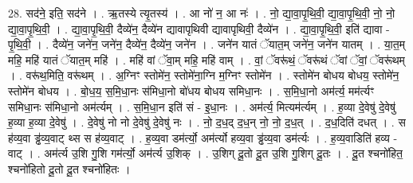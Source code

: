 \documentclass[17pt]{extarticle}
\begin{document}
28. सद॑ने॒ इति॒ सद॑ने । . ऋ॒तस्ये त्यृ॒तस्य॑ । . आ नो॑ न॒ आ नः॑ । . नो॒ द्या॒वा॒पृ॒थि॒वी॒ द्या॒वा॒पृ॒थि॒वी॒ नो॒ नो॒ द्या॒वा॒पृ॒थि॒वी॒ । . द्या॒वा॒पृ॒थि॒वी॒ दैव्ये॑न॒ दैव्ये॑न द्यावापृथिवी द्यावापृथिवी॒ दैव्ये॑न । . द्या॒वा॒पृ॒थि॒वी॒ इति॑ द्यावा - पृ॒थि॒वी॒ । . दैव्ये॑न॒ जने॑न॒ जने॑न॒ दैव्ये॑न॒ दैव्ये॑न॒ जने॑न । . जने॑न यातं ॅयात॒म् जने॑न॒ जने॑न यातम् । . या॒त॒म् महि॒ महि॑ यातं ॅयात॒म् महि॑ । . महि॑ वां ॅवा॒म् महि॒ महि॑ वाम् । . वां॒ ॅवरू॑थं॒ ॅवरू॑थं ॅवां ॅवां॒ ॅवरू॑थम् । . वरू॑थ॒मिति॒ वरू॑थम् । . अ॒ग्निꣳ स्तोमे॑न॒ स्तोमे॑ना॒ग्नि म॒ग्निꣳ स्तोमे॑न । . स्तोमे॑न बोधय बोधय॒ स्तोमे॑न॒ स्तोमे॑न बोधय । . बो॒ध॒य॒ स॒मि॒धा॒नः स॑मिधा॒नो बो॑धय बोधय समिधा॒नः । . स॒मि॒धा॒नो अम॑र्त्य॒ मम॑र्त्यꣳ समिधा॒नः स॑मिधा॒नो अम॑र्त्यम् । . स॒मि॒धा॒न इति॑ सं - इ॒धा॒नः । . अम॑र्त्य॒ मित्यम॑र्त्यम् । . ह॒व्या दे॒वेषु॑ दे॒वेषु॑ ह॒व्या ह॒व्या दे॒वेषु॑ । . दे॒वेषु॑ नो नो दे॒वेषु॑ दे॒वेषु॑ नः । . नो॒ द॒ध॒द् द॒ध॒न् नो॒ नो॒ द॒ध॒त् । . द॒ध॒दिति॑ दधत् । . स ह॑व्य॒वा ड्ढ॑व्य॒वाट् थ्स स ह॑व्य॒वाट् । . ह॒व्य॒वा डम॑र्त्यो॒ अम॑र्त्यो हव्य॒वा ड्ढ॑व्य॒वा डम॑र्त्यः । . ह॒व्य॒वाडिति॑ हव्य - वाट् । . अम॑र्त्य उ॒शि गु॒शि गम॑र्त्यो॒ अम॑र्त्य उ॒शिक् । . उ॒शिग् दू॒तो दू॒त उ॒शि गु॒शिग् दू॒तः । . दू॒त श्चनो॑हित॒ श्चनो॑हितो दू॒तो दू॒त श्चनो॑हितः । \newline
\end{document}
